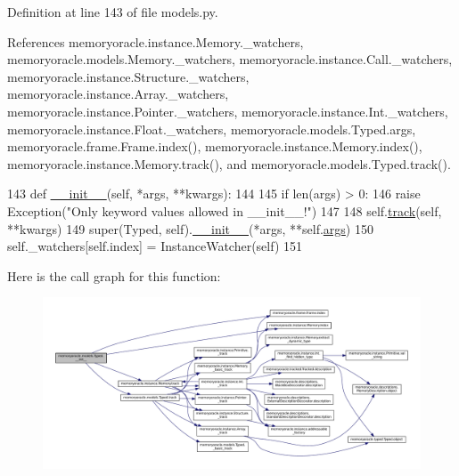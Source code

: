 Definition at line 143 of file models.\+py.



References memoryoracle.\+instance.\+Memory.\+\_\+watchers, memoryoracle.\+models.\+Memory.\+\_\+watchers, memoryoracle.\+instance.\+Call.\+\_\+watchers, memoryoracle.\+instance.\+Structure.\+\_\+watchers, memoryoracle.\+instance.\+Array.\+\_\+watchers, memoryoracle.\+instance.\+Pointer.\+\_\+watchers, memoryoracle.\+instance.\+Int.\+\_\+watchers, memoryoracle.\+instance.\+Float.\+\_\+watchers, memoryoracle.\+models.\+Typed.\+args, memoryoracle.\+frame.\+Frame.\+index(), memoryoracle.\+instance.\+Memory.\+index(), memoryoracle.\+instance.\+Memory.\+track(), and memoryoracle.\+models.\+Typed.\+track().


\begin{DoxyCode}
143     \textcolor{keyword}{def }\hyperlink{classmemoryoracle_1_1models_1_1Typed_a494dfbe205034b874ff9e8c7039f579b}{\_\_init\_\_}(self, *args, **kwargs):
144 
145         \textcolor{keywordflow}{if} len(args) > 0:
146             \textcolor{keywordflow}{raise} Exception(\textcolor{stringliteral}{"Only keyword values allowed in \_\_init\_\_!"})
147 
148         self.\hyperlink{classmemoryoracle_1_1models_1_1Typed_aa1d5d8d5b7ebe5c2876f363e7eb669db}{track}(self, **kwargs)
149         super(Typed, self).\hyperlink{classmemoryoracle_1_1models_1_1Typed_a494dfbe205034b874ff9e8c7039f579b}{\_\_init\_\_}(*args, **self.\hyperlink{classmemoryoracle_1_1models_1_1Typed_a81616ab75a5a3b89f9707d0342033614}{args})
150         self.\_watchers[self.index] = InstanceWatcher(self)
151 
\end{DoxyCode}


Here is the call graph for this function\+:
\nopagebreak
\begin{figure}[H]
\begin{center}
\leavevmode
\includegraphics[width=350pt]{classmemoryoracle_1_1models_1_1Typed_a494dfbe205034b874ff9e8c7039f579b_cgraph}
\end{center}
\end{figure}




